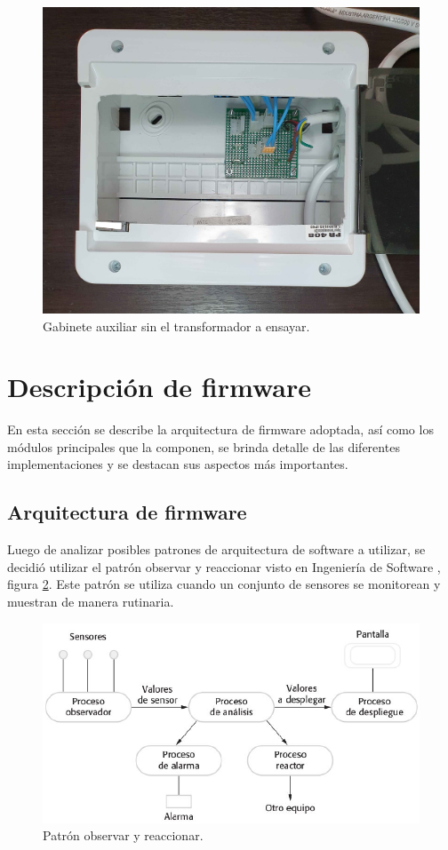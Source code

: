 \begin{figure}[hb]
	\centering
	\includegraphics[scale=0.08]{./Figures/gab4.jpg}
	\caption{Gabinete auxiliar sin el transformador a ensayar.}
	\label{fig:gab4}
\end{figure}


\section{Descripción de firmware}

En esta sección se describe la arquitectura de firmware adoptada, así como los módulos principales que la componen, se brinda detalle de las diferentes implementaciones y se destacan sus aspectos más importantes.

\subsection{Arquitectura de firmware}
Luego de analizar posibles patrones de arquitectura de software a utilizar, se decidió utilizar el patrón observar y reaccionar visto en Ingeniería de Software \citep{INGSOFT}, figura \ref{fig:patron}. Este patrón se utiliza cuando un conjunto de sensores se monitorean y muestran de manera rutinaria.

\begin{figure}[htpb]
	\centering
	\includegraphics[scale=0.55]{./Figures/patron.png}
	\caption{Patrón observar y reaccionar.}
	\label{fig:patron}
\end{figure}

